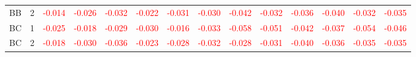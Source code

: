 \begin{table}[!htb]
{\begin{tabular}{llcccccccccccc}
BB & 2 & \textcolor{red}{-0.014} & \textcolor{red}{-0.026} & \textcolor{red}{-0.032} & \textcolor{red}{-0.022} & \textcolor{red}{-0.031} & \textcolor{red}{-0.030} & \textcolor{red}{-0.042} & \textcolor{red}{-0.032} & \textcolor{red}{-0.036} & \textcolor{red}{-0.040} & \textcolor{red}{-0.032} & \textcolor{red}{-0.035}\\
BC & 1 & \textcolor{red}{-0.025} & \textcolor{red}{-0.018} & \textcolor{red}{-0.029} & \textcolor{red}{-0.030} & \textcolor{red}{-0.016} & \textcolor{red}{-0.033} & \textcolor{red}{-0.058} & \textcolor{red}{-0.051} & \textcolor{red}{-0.042} & \textcolor{red}{-0.037} & \textcolor{red}{-0.054} & \textcolor{red}{-0.046}\\
BC & 2 & \textcolor{red}{-0.018} & \textcolor{red}{-0.030} & \textcolor{red}{-0.036} & \textcolor{red}{-0.023} & \textcolor{red}{-0.028} & \textcolor{red}{-0.032} & \textcolor{red}{-0.028} & \textcolor{red}{-0.031} & \textcolor{red}{-0.040} & \textcolor{red}{-0.036} & \textcolor{red}{-0.035} & \textcolor{red}{-0.035}\\
\hline
    \end{tabular}%
    }
\end{table}

